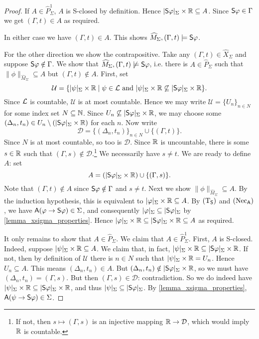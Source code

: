 \begin{proof}
    If $A \in \widehat{P}_\Sigma^1$, $A$ is S-closed by definition.  Hence
    $|\S\phi|_\Sigma \times \R \subseteq A$. Since $\S\phi \in \Gamma$ we get
    $(\Gamma, t) \in A$ as required.

    In either case we have $(\Gamma, t) \in A$. This shows $\widehat{M}_\Sigma,
    (\Gamma, t) \models \S\phi$.

    For the other direction we show the contrapositive. Take any $(\Gamma, t)
    \in \widehat{X}_\Sigma$ and suppose $\S\phi \notin \Gamma$. We show that
    $\widehat{M}_\Sigma, (\Gamma, t) \not\models \S\phi$, i.e. there is $A \in
    \widehat{P}_\Sigma$ such that $\|\phi\|_{\widehat{M}_\Sigma} \subseteq A$
    but $(\Gamma, t) \notin A$.
    First, set
    \[
        \mathcal{U} = \{
        |\psi|_\Sigma \times \R
        \mid
        \psi \in \cL \text{ and }
        |\psi|_\Sigma \times \R \not\subseteq |\S\phi|_\Sigma \times \R
        \}.
    \]
    Since $\cL$ is countable, $\mathcal{U}$ is at most countable.
    Hence we may write $\mathcal{U} = \{U_n\}_{n \in N}$ for some
    index set $N \subseteq \N$. Since $U_n \not\subseteq
    |\S\phi|_\Sigma \times \R$, we may choose some $(\Delta_n, t_n)
    \in U_n \setminus (|\S\phi|_\Sigma \times \R)$ for each $n$. Now
    write
    \[
      \mathcal{D} = \{(\Delta_n, t_n)\}_{n \in N} \cup \{(\Gamma,
      t)\}.
    \]
    Since $N$ is at most countable, so too is $\mathcal{D}$.  Since
    $\R$ is uncountable, there is some $s \in \R$ such that $(\Gamma,
    s) \notin \mathcal{D}$.\footnote{If not, then $s \mapsto
    (\Gamma, s)$ is an injective mapping $\R \to \mathcal{D}$, which
    would imply $\R$ is countable.} We necessarily have $s \ne t$. We
    are ready to define $A$: set
    \[
      A = (|\S\phi|_\Sigma \times \R) \cup \{(\Gamma, s)\}.
    \]
    Note that $(\Gamma, t) \notin A$ since $\S\phi \notin \Gamma$ and
    $s \ne t$.
    Next we show $\|\phi\|_{\widehat{M}_\Sigma} \subseteq A$. By the
    induction hypothesis, this is equivalent to $|\phi|_\Sigma \times
    \R \subseteq A$. By $\Tsoundness$ and $\necuniv$, we have
    $\A(\phi \limplies \S\phi) \in \Sigma$, and consequently
    $|\phi|_\Sigma \subseteq |\S\phi|_\Sigma$ by
    \cref{lemma_xsigma_properties}. Hence $|\phi|_\Sigma \times \R
    \subseteq |\S\phi|_\Sigma \times \R \subseteq A$ as required.

    It only remains to show that $A \in \widehat{P}_\Sigma$. We claim
    that $A \in \widehat{P}_\Sigma^1$. First, $A$ is S-closed.
    Indeed, suppose $|\psi|_\Sigma \times \R \subseteq A$. We claim
    that, in fact, $|\psi|_\Sigma \times \R \subseteq |\S\phi|_\Sigma
    \times \R$. If not, then by definition of $\mathcal{U}$ there is
    $n \in N$ such that $|\psi|_\Sigma \times \R = U_n$.  Hence $U_n
    \subseteq A$. This means $(\Delta_n, t_n) \in A$. But
    $(\Delta_n, t_n) \notin |\S\phi|_\Sigma \times \R$, so we must
    have $(\Delta_n, t_n) = (\Gamma, s)$. But then $(\Gamma, s) \in
    \mathcal{D}$: contradiction. So we do indeed have $|\psi|_\Sigma
    \times \R \subseteq |\S\phi|_\Sigma \times \R$, and thus
    $|\psi|_\Sigma \subseteq |\S\phi|_\Sigma$. By
    \cref{lemma_xsigma_properties}, $\A(\psi \limplies \S\phi) \in
    \Sigma$.


\end{proof}
